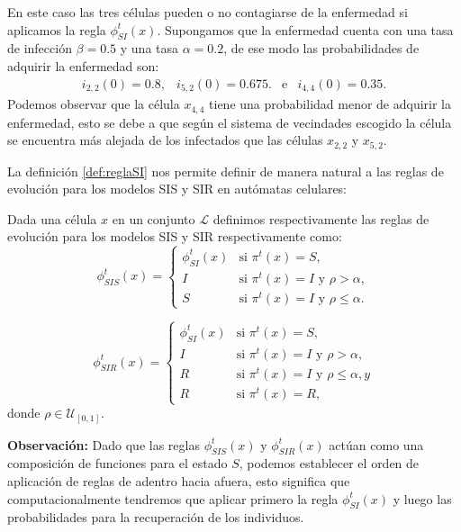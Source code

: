 \begin{example}
En este caso las tres células pueden o no contagiarse de la enfermedad si aplicamos la regla $\phi_{SI}^t(x)$. Supongamos que la enfermedad cuenta con una tasa de infección $\beta=0.5$ y una tasa $\alpha=0.2$, de ese modo las probabilidades de adquirir la enfermedad son:
$$\begin{array}{ccccc}
    i_{2,2}(0)=0.8, & i_{5,2}(0)=0.675. & \text{e} & i_{4,4}(0)=0.35.
\end{array}$$
Podemos observar que la célula $x_{4,4}$ tiene una probabilidad menor de adquirir la enfermedad, esto se debe a que según el sistema de vecindades escogido la célula se encuentra más alejada de los infectados que las células $x_{2,2}$ y $x_{5,2}$.
\end{example}

La definición \ref{def:reglaSI} nos permite definir de manera natural a las reglas de evolución para los modelos SIS y SIR en autómatas celulares:

\begin{definition}\label{def:reglasSISySIR}
Dada una célula $x$ en un conjunto $\mathcal{L}$ definimos respectivamente las reglas de evolución para los modelos SIS y SIR respectivamente como:
\begin{equation}
    \phi_{SIS}^t(x)=\left\{\begin{array}{ll}
        \phi_{SI}^t(x) & \text{si }\pi^t(x) = S,\\
        I & \text{si }\pi^t(x)=I\text{ y }\rho>\alpha,\\
        S & \text{si }\pi^t(x)=I\text{ y }\rho\leq\alpha.
    \end{array}\right.
\end{equation}

\begin{equation}
    \phi_{SIR}^t(x)=\left\{\begin{array}{ll}
        \phi_{SI}^t(x) & \text{si }\pi^t(x) = S,\\
        I & \text{si }\pi^t(x)=I\text{ y }\rho>\alpha,\\
        R & \text{si }\pi^t(x)=I\text{ y }\rho\leq\alpha, y \\
        R & \text{si }\pi^t(x)=R,
    \end{array}\right.
\end{equation}
donde $\rho\in\mathcal{U}_{[0,1]}$.
\end{definition}

\textbf{Observación:} Dado que las reglas $\phi_{SIS}^t(x)$ y $\phi_{SIR}^t(x)$ actúan como una composición de funciones para el estado $S$, podemos establecer el orden de aplicación de reglas de adentro hacia afuera, esto significa que computacionalmente tendremos que aplicar primero la regla $\phi_{SI}^t(x)$ y luego las probabilidades para la recuperación de los individuos.

